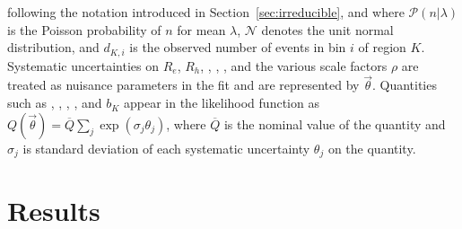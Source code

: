 following the notation introduced in Section~\ref{sec:irreducible}, and where $\mathcal{P}(n\vert\lambda)$ is the Poisson probability of $n$ for mean $\lambda$, $\mathcal{N}$ denotes the unit normal distribution, and $d_{K,i}$ is the observed number of events in bin $i$ of region $K$.
Systematic uncertainties on $R_e$, $R_h$, \kqcd, \ksudakov, \kphoton, and the various scale factors $\rho$ are treated as nuisance parameters in the fit and are represented by $\vec{\theta}$. 
Quantities such as \RZll, \RWl, \fZW, \nhalo, and $b_{K}$ appear in the likelihood function as $Q(\vec \theta) = \overline{Q} \sum\limits_{j}\exp(\sigma_{j}\theta_{j})$, where $\overline{Q}$ is the nominal value of the quantity and $\sigma_{j}$ is standard deviation of each systematic uncertainty $\theta_{j}$ on the quantity.

\section{Results}
\label{sec:results}


